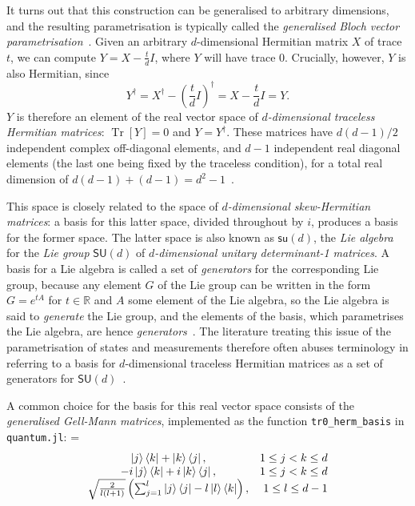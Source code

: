 \documentclass[10pt, a4paper]{article}
\numberwithin{equation}{section} %
\theoremstyle{definition}
\theoremstyle{plain}
\newenvironment{Array}[1] %
{\def\arraystretch{1.75}\everymath={\displaystyle}\begin{equation}\begin{array}{#1}}
{\end{array}\end{equation}}
\newcommand{\?}{\mathrel{?}} %
\newcommand{\R}{\mathbb{R}} %
\newcommand{\Tr}[2][]{\mathop{\mathrm{Tr}#1}\left[ #2 \right]} %
\begin{document}
\begin{appendices}
                    It turns out that this construction can be generalised to arbitrary dimensions, and the resulting parametrisation is typically called the \emph{generalised Bloch vector parametrisation}~\cite{DensMatParam}. Given an arbitrary \(d\)-dimensional Hermitian matrix \(X\) of trace \(t\), we can compute \(Y = X - \frac{t}{d}I\), where \(Y\) will have trace 0. Crucially, however, \(Y\) is also Hermitian, since
                    \[ Y^{\dagger} = X^{\dagger} - {\left(\frac{t}{d}I\right)}^{\dagger} = X - \frac{t}{d}I = Y. \]
                    \(Y\) is therefore an element of the real vector space of \emph{\(d\)-dimensional traceless Hermitian matrices}: \(\Tr{Y} = 0\) and \(Y = Y^{\dagger}\). These matrices have \(d(d-1)/2\) independent complex off-diagonal elements, and \(d-1\) independent real diagonal elements (the last one being fixed by the traceless condition), for a total real dimension of \(d(d-1)+(d-1) = d^2-1\)~\cite{CompositeParam}.

                    This space is closely related to the space of \emph{\(d\)-dimensional skew-Hermitian matrices}: a basis for this latter space, divided throughout by \(i\), produces a basis for the former space. The latter space is also known as \(\mathsf{su}(d)\), the \emph{Lie algebra} for the \emph{Lie group} \(\mathsf{SU}(d)\) of \emph{\(d\)-dimensional unitary determinant-1 matrices}. A basis for a Lie algebra is called a set of \emph{generators} for the corresponding Lie group, because any element \(G\) of the Lie group can be written in the form \(G = e^{tA}\) for \(t\in\R\) and \(A\) some element of the Lie algebra, so the Lie algebra is said to \emph{generate} the Lie group, and the elements of the basis, which parametrises the Lie algebra, are hence \emph{generators}~\cite{HallQuantumForMath}. The literature treating this issue of the parametrisation of states and measurements therefore often abuses terminology in referring to a basis for \(d\)-dimensional traceless Hermitian matrices as a set of generators for \(\mathsf{SU}(d)\)~\cite{QuditBloch,DensMatParam}.

                    A common choice for the basis for this real vector space consists of the \emph{generalised Gell-Mann matrices}, implemented as the function \verb`tr0_herm_basis` in \verb`quantum.jl`:
                    \begin{Array}{cr}
                      \ket{j}\bra{k}+\ket{k}\bra{j}, & 1 \leq j < k \leq d \\
                      -i\ket{j}\bra{k}+i\ket{k}\bra{j}, & 1 \leq j < k \leq d \\
                      \sqrt{\frac{2}{l(l+1)}} \left( \sum_{j=1}^l \ket{j}\bra{j} - l\ket{l}\bra{k} \right), & 1 \leq l \leq d-1 \\
                    \end{Array}


\end{appendices}
\end{document}
